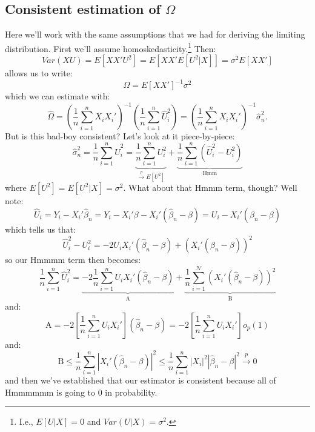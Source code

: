 \documentclass{tufte-book}
\theoremstyle{mytheoremstyle}
\theoremstyle{mylemstyle}
\theoremstyle{mydefstyle}
\begin{document}
\subsection{Consistent estimation of \(\Omega\)}
Here we'll work with the same assumptions that we had for deriving the limiting distribution. First we'll assume homoskedasticity.\footnote{I.e., \(E[U|X] = 0\) and \(Var(U|X) = \sigma^2\).} Then:
	\[Var(XU) = E[XX'U^2] = E[XX'E[U^2|X]] = \sigma^2E[XX']\]
allows us to write:
	\[\Omega = E[XX']^{-1}\sigma^2\]
which we can estimate with:
	\[\hat{\Omega} = \left(\frac{1}{n} \sum_{i=1}^n X_iX_i'\right)^{-1}\left(\frac{1}{n}\sum_{i=1}^n \hat{U}_i^2\right) =  \left(\frac{1}{n} \sum_{i=1}^n X_iX_i'\right)^{-1}\hat{\sigma}^2_n \text{.}\]
But is this bad-boy consistent? Let's look at it piece-by-piece:
	\[\hat{\sigma}_n^2 = \frac{1}{n}\sum_{i=1}^n \hat{U}_i^2 = \underbrace{\frac{1}{n}\sum_{i=1}^n U_i^2}_\textrm{\(\overset{p}{\rightarrow} E[U^2]\)} + \underbrace{\frac{1}{n}\sum_{i=1}^n (\hat{U}_i^2 - U_i^2)}_\textrm{Hmm}\]
where \(E[U^2] = E[U^2|X] = \sigma^2\). What about that Hmmm term, though? Well note:
	\[\hat{U}_i = Y_i - X_i'\hat{\beta}_n = Y_i - X_i'\beta - X_i'(\hat{\beta}_n - \beta) = U_i - X_i'(\hat{\beta}_n - \beta)\]
which tells us that:
	\[\hat{U}_i^2 - U_i^2 = -2U_iX_i'(\hat{\beta}_n - \beta) + (X_i'(\hat{\beta}_n - \beta))^2\]
so our Hmmmm term then becomes:
	\[\frac{1}{n}\sum_{i=1}^n \hat{U}_i^2 = \underbrace{-2\frac{1}{n}\sum_{i=1}^n U_iX_i'(\hat{\beta}_n - \beta)}_\textrm{A} + \underbrace{\frac{1}{n}\sum_{i=1}^\mathcal{N}(X_i'(\hat{\beta}_n - \beta))^2}_\textrm{B}\]
and:
	\[\textrm{A} = -2\left[\frac{1}{n}\sum_{i=1}^n U_iX_i'\right](\hat{\beta}_n - \beta) = -2\left[\frac{1}{n}\sum_{i=1}^n U_iX_i'\right]o_p(1)\]
and:
	\[\textrm{B} \le \frac{1}{n} \sum_{i=1}^n |X_i'(\hat{\beta}_n - \beta)|^2 \le \frac{1}{n} \sum_{i=1}^n |X_i|^2 |\hat{\beta}_n - \beta|^2 \overset{p}{\rightarrow} 0\]
and then we've established that our estimator is consistent because all of Hmmmmmm is going to 0 in probability.
\end{document}
